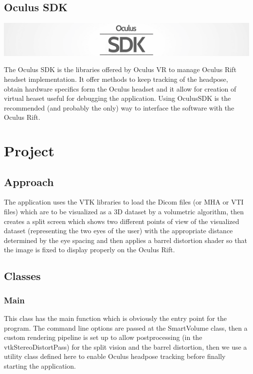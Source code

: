 \documentclass[11pt]{article} %
\begin{document}
\subsection{Oculus SDK}
\includegraphics[width=0.4\linewidth,clip,trim=7cm -3mm 5cm -2mm]{Oculus_sdk.png}

The Oculus SDK is the libraries offered by Oculus VR to manage Oculus Rift headset implementation. It offer methods to keep tracking of the headpose, obtain hardware specifics form the Oculus headset and it allow for creation of virtual heaset useful for debugging the application.
Using OculusSDK is the recommended (and probably the only) way to interface the software with the Oculus Rift.













\newpage
\section{Project}

\subsection{Approach}
The application uses the VTK libraries to load the Dicom files (or MHA or VTI files) which are to be visualized as a 3D dataset by a volumetric algorithm, then creates a split screen which shows two different points of view of the visualized dataset (representing the two eyes of the user) with the appropriate distance determined by the eye spacing and then applies a barrel distortion shader so that the image is fixed to display properly on the Oculus Rift.

\subsection{Classes}

%
\subsubsection{Main}
This class has the main function which is obviously the entry point for the program. The command line options are passed at the SmartVolume class, then a custom rendering pipeline is set up to allow postprocessing (in the vtkStereoDistortPass) for the split vision and the barrel distortion, then we use a utility class defined here to enable Oculus headpose tracking before finally starting the application.
\end{document}
